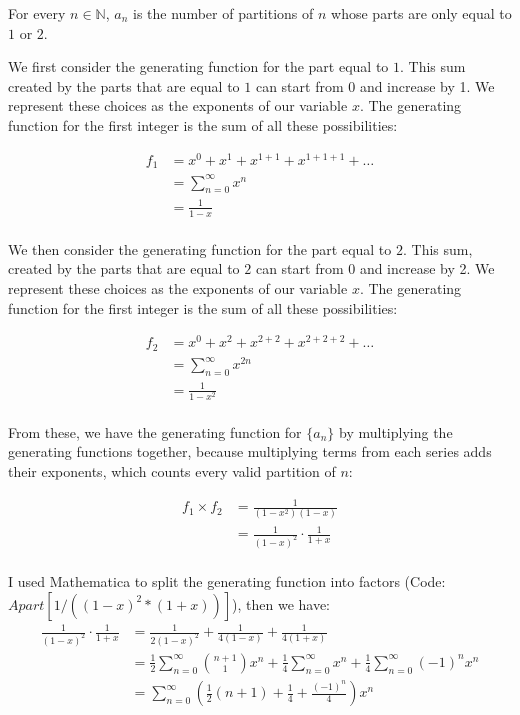\documentclass[10pt]{article}
\begin{document}
\begin{enumerate}
\begin{enumerate}
For every $n \in \mathbb{N}$, $a_n$ is the number of partitions of $n$ whose parts are only equal to $1$ or $2$.

We first consider the generating function for the part equal to $1$.
This sum created by the parts that are equal to $1$ can start from 0 and increase by 1. We represent these choices as the exponents of our variable $x$. The generating function for the first integer is the sum of all these possibilities:

\begin{align*}
f_{1} &= x^0+x^1 + x^{1+1} + x^{1+1+1} + \ldots  \\
    &= \sum\limits^{\infty}_{n=0}x^n\\
    &= \frac{1}{1-x} \\
\end{align*}

We then consider the generating function for the part equal to $2$.
This sum, created by the parts that are equal to $2$ can start from 0 and increase by 2. We represent these choices as the exponents of our variable $x$. The generating function for the first integer is the sum of all these possibilities:

\begin{align*}
f_{2} &= x^0+x^2 + x^{2+2} + x^{2+2+2} + \ldots  \\
    &= \sum\limits^{\infty}_{n=0}x^{2n}\\
    &= \frac{1}{1-x^2} \\
\end{align*}

From these, we have the generating function for $\{a_n\}$ by multiplying the generating functions together, because multiplying terms from each series adds their exponents, which counts every valid partition of $n$: 

\begin{align*}
    f_{1} \times f_{2}&= \frac{1}{(1-x^2)(1-x)}\\
    &= \frac{1}{(1-x)^2}\cdot\frac{1}{1+x}\\
\end{align*}

I used Mathematica to split the generating function into factors (Code: $Apart[1/((1-x)^2*(1+x))]$), then we have:
\begin{align*}
    \frac{1}{(1-x)^2}\cdot\frac{1}{1+x} &= \frac{1}{2(1-x)^2} + \frac{1}{4(1-x)} + \frac{1}{4(1+x)}\\
    &=\frac{1}{2}\sum\limits^{\infty}_{n=0}\binom{n+1}{1}x^{n}+\frac{1}{4}\sum\limits^{\infty}_{n=0}x^{n}+\frac{1}{4}\sum\limits^{\infty}_{n=0}(-1)^nx^{n}\\
    &= \sum\limits^{\infty}_{n=0}\left(\frac{1}{2}(n+1)+\frac{1}{4}+\frac{(-1)^n}{4}\right)x^n
\end{align*}


\end{enumerate}
\end{enumerate}
\end{document}
